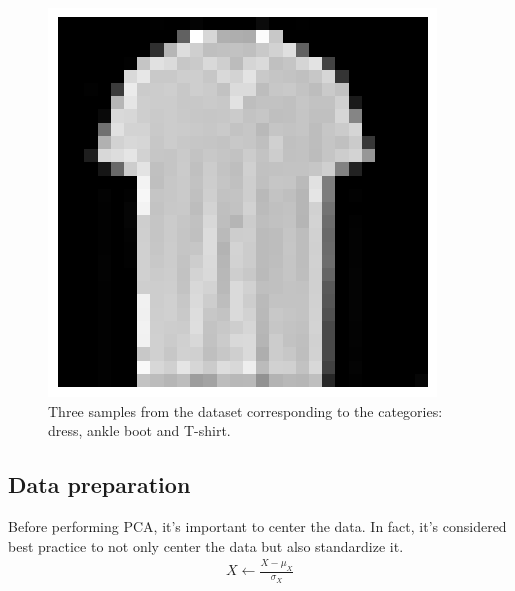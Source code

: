 \begin{figure}[H]
\begin{minipage}{0.14\textwidth}
    \end{minipage}
    \begin{minipage}{0.14\textwidth}
        \centering
        \includegraphics[width=\textwidth]{figures/tshirt.png}
    \end{minipage}
    \caption{Three samples from the dataset corresponding to the categories: dress, ankle boot and T-shirt.}
\end{figure}


\subsection{Data preparation}
Before performing PCA, it's important to center the data. In fact, it's considered best practice to not only center the data but also standardize it.
\begin{align}
    X \leftarrow \frac{X - \mu_X}{\sigma_X}
\end{align}



